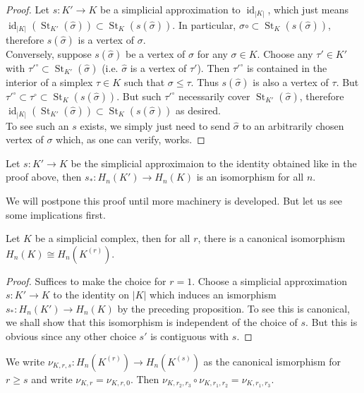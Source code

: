 \begin{proof}
    Let $s:K'\to K$ be a simplicial approximation to $\operatorname{id}_{|K|}$, which just means $\operatorname{id}_{|K|}(\operatorname{St}_{K'}(\hat\sigma))\subset\operatorname{St}_K(s(\hat\sigma))$.
    In particular, $\sigma\circ\subset\operatorname{St}_K(s(\hat\sigma))$, therefore $s(\hat\sigma)$ is a vertex of $\sigma$.\\
    Conversely, suppose $s(\hat\sigma)$ be a vertex of $\sigma$ for any $\sigma\in K$.
    Choose any $\tau'\in K'$ with $\tau'^\circ\subset\operatorname{St}_{K'}(\hat\sigma)$ (i.e. $\hat\sigma$ is a vertex of $\tau'$).
    Then $\tau'^\circ$ is contained in the interior of a simplex $\tau\in K$ such that $\sigma\le\tau$.
    Thus $s(\hat\sigma)$ is also a vertex of $\tau$.
    But $\tau'^\circ\subset\tau^\circ\subset\operatorname{St}_K(s(\hat\sigma))$.
    But such $\tau'^\circ$ necessarily cover $\operatorname{St}_{K'}(\hat\sigma)$, therefore $\operatorname{id}_{|K|}(\operatorname{St}_{K'}(\hat\sigma))\subset\operatorname{St}_K(s(\hat\sigma))$ as desired.\\
    To see such an $s$ exists, we simply just need to send $\hat\sigma$ to an arbitrarily chosen vertex of $\sigma$ which, as one can verify, works.
\end{proof}
\begin{proposition}\label{barycentric_iso_homol}
    Let $s:K'\to K$ be the simplicial approximaion to the identity obtained like in the proof above, then $s_\ast:H_n(K')\to H_n(K)$ is an isomorphism for all $n$.
\end{proposition}
We will postpone this proof until more machinery is developed.
But let us see some implications first.
\begin{corollary}
    Let $K$ be a simplicial complex, then for all $r$, there is a canonical isomorphism $H_n(K)\cong H_n(K^{(r)})$.
\end{corollary}
\begin{proof}
    Suffices to make the choice for $r=1$.
    Choose a simplicial approximation $s:K'\to K$ to the identity on $|K|$ which induces an ismorphism $s_\ast:H_n(K')\to H_n(K)$ by the preceding proposition.
    To see this is canonical, we shall show that this isomorphism is independent of the choice of $s$.
    But this is obvious since any other choice $s'$ is contiguous with $s$.
\end{proof}
We write $\nu_{K,r,s}:H_n(K^{(r)})\to H_n(K^{(s)})$ as the canonical ismorphism for $r\ge s$ and write $\nu_{K,r}=\nu_{K,r,0}$.
Then $\nu_{K,r_2,r_3}\circ \nu_{K,r_1,r_2}=\nu_{K,r_1,r_3}$.
